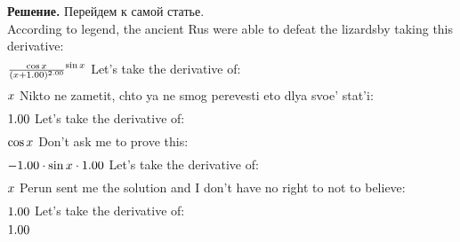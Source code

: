 \documentclass[12pt,a4paper]{extreport}
\theoremstyle{plain}
\theoremstyle{definition}
\newenvironment{solution}%
{\par\noindent\textbf{Решение. }}%
{\bigskip}
\begin{document}
\begin{solution}
Перейдем к самой статье. \\
According to legend, the ancient Rus were able to defeat the lizardsby taking this derivative:
\begin{gather}
\end{gather}
\begin{math}
\frac {\cos x }{(x + 1.00 )^ {2.00 }}^ {\sin x }\\
\end{math}
Let's take the derivative of: 
\begin{gather}
\end{gather}
\begin{math}
x \\
\end{math}
Nikto ne zametit, chto ya ne smog perevesti eto dlya svoe' stat'i: 
\begin{gather}
\end{gather}
\begin{math}
1.00 \\
\end{math}
Let's take the derivative of: 
\begin{gather}
\end{gather}
\begin{math}
\cos x \\
\end{math}
Don't ask me to prove this: 
\begin{gather}
\end{gather}
\begin{math}
-1.00 \cdot \sin x \cdot 1.00 \\
\end{math}
Let's take the derivative of: 
\begin{gather}
\end{gather}
\begin{math}
x \\
\end{math}
Perun sent me the solution and I don't have no right to not to believe: 
\begin{gather}
\end{gather}
\begin{math}
1.00 \\
\end{math}
Let's take the derivative of: 
\begin{gather}
\end{gather}
\begin{math}
1.00 \\
\end{math}

\end{solution}
\end{document}
